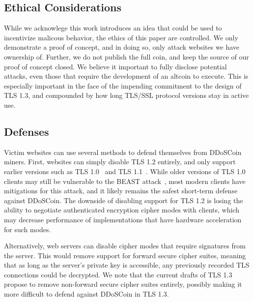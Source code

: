 

\subsection{Ethical Considerations}
While we acknowlege this work introduces an idea that could be used to incentivize 
malicous behavior, the ethics of this paper are controlled. We only demonstrate a 
proof of concept, and in doing so, only attack websites we have ownership of.
Further, we do not publish the full coin, and keep the source of our proof of concept
closed. We believe it important to fully disclose potential attacks, even those that
require the development of an altcoin to execute. This is especially important in the
face of the impending commitment to the design of TLS 1.3, and compounded by how long 
TLS/SSL protocol versions stay in active use.


\subsection{Defenses}
\label{sec:defense}

Victim websites can use several methods to defend themselves from
DDoSCoin miners. First, websites can simply disable TLS 1.2 entirely, and only
support earlier versions such as TLS 1.0~\cite{rfc2246} and TLS
1.1~\cite{rfc4346}. While older versions of
TLS 1.0 clients may still be vulnerable to the BEAST attack~\cite{beast}, most
modern clients have mitigations for this attack, and it likely remains the
safest short-term defense against DDoSCoin. The downside of disabling support
for TLS 1.2 is losing the ability to negotiate authenticated encryption cipher
modes with clients, which may decrease performance of implementations that have
hardware acceleration for such modes.

Alternatively, web servers can disable cipher modes that require signatures from
the server. This would remove support for forward secure cipher suites, meaning
that as long as the server's private key is accessible, any previously recorded
TLS connections could be decrypted. We note that the current drafts of TLS 1.3
propose to remove non-forward secure cipher suites entirely, possibly making it
more difficult to defend against DDoSCoin in TLS 1.3.

